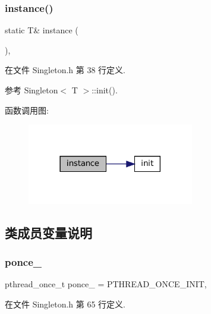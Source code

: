 \subsubsection{\texorpdfstring{instance()}{instance()}}
{\footnotesize\ttfamily static T\& instance (\begin{DoxyParamCaption}{ }\end{DoxyParamCaption})\hspace{0.3cm}{\ttfamily [inline]}, {\ttfamily [static]}}



在文件 Singleton.\+h 第 38 行定义.



参考 Singleton$<$ T $>$\+::init().

函数调用图\+:
\nopagebreak
\begin{figure}[H]
\begin{center}
\leavevmode
\includegraphics[width=206pt]{classmuduo_1_1Singleton_a359703743cd890f1e3df60b6b06a5724_cgraph}
\end{center}
\end{figure}


\subsection{类成员变量说明}
\mbox{\label{classmuduo_1_1Singleton_a5be9f10bcf679ada586228d592b52644}} 
\subsubsection{\texorpdfstring{ponce\+\_\+}{ponce\_}}
{\footnotesize\ttfamily pthread\+\_\+once\+\_\+t ponce\+\_\+ = P\+T\+H\+R\+E\+A\+D\+\_\+\+O\+N\+C\+E\+\_\+\+I\+N\+IT\hspace{0.3cm}{\ttfamily [static]}, {\ttfamily [private]}}



在文件 Singleton.\+h 第 65 行定义.

